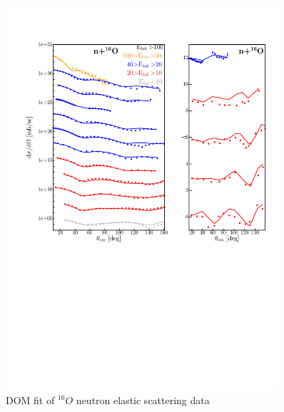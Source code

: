 \begin{figure}
\begin{center}
\includegraphics[width = 0.9\textwidth]{figures/o16_neutronElastic.png}
\caption{DOM fit of $^{16}O$ neutron elastic scattering data}
\label{o16NeutronElastic}
\end{center}
\end{figure}


